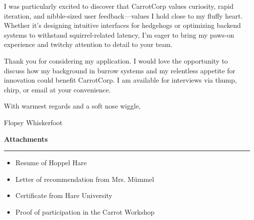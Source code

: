 \documentclass[
11pt, %
]{letter}
\begin{document}
	I was particularly excited to discover that CarrotCorp values curiosity, rapid iteration, and nibble-sized user feedback—values I hold close to my fluffy heart. Whether it’s designing intuitive interfaces for hedgehogs or optimizing backend systems to withstand squirrel-related latency, I’m eager to bring my paws-on experience and twitchy attention to detail to your team.
	
	Thank you for considering my application. I would love the opportunity to discuss how my background in burrow systems and my relentless appetite for innovation could benefit CarrotCorp. I am available for interviews via thump, chirp, or email at your convenience.
	
	\smallskip
	
	With warmest regards and a soft nose wiggle,
	
	
	Flopsy Whiskerfoot
	
	
	\newpage
	
	\textcolor{RubricTextColor}{\textbf{Attachments}} \\
	\textcolor{RubricTextColor}{\rule{\linewidth}{1pt}} %
	
	\begin{itemize}
		\item Resume of Hoppel Hare
		\item Letter of recommendation from Mrs. Mümmel
		\item Certificate from Hare University
		\item Proof of participation in the Carrot Workshop
	\end{itemize}
	
	
\end{document}
